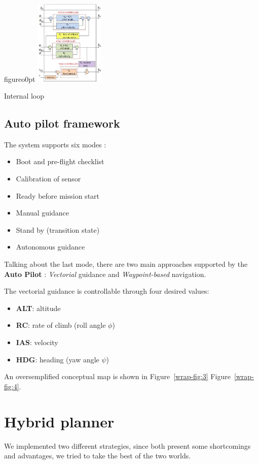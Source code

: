 \documentclass[oneside,onecolumn]{article}
\begin{document}
\begin{wrapfloat}{figure}{o}{0pt}
  \includegraphics[width=0.25\textwidth]{intLoop}
  \caption{Internal loop}\label{wrap-fig:4}
\end{wrapfloat} 


\subsection{Auto pilot framework}

The system supports six modes :
\begin{itemize}
\item Boot and pre-flight checklist
\item Calibration of sensor 
\item Ready before mission start
\item Manual guidance
\item Stand by (transition state)
\item Autonomous guidance
\end{itemize}

Talking about the last mode, there are two main approaches supported by the
\textbf{Auto Pilot} : \textit{Vectorial} guidance and \textit{Waypoint-based}
navigation.



The vectorial guidance is controllable through four desired values:
\begin{itemize}
\item \textbf{ALT}: altitude
\item \textbf{RC}: rate of climb (roll angle $\phi$)
\item \textbf{IAS}: velocity
\item \textbf{HDG}: heading (yaw angle $\psi$)
\end{itemize}
An oversemplified conceptual map is shown in Figure~\ref{wrap-fig:3} Figure~\ref{wrap-fig:4}.
\newpage
\section{Hybrid planner}
We implemented two different strategies, since both present some shortcomings
and advantages, we tried to take the best of the two worlds.
\end{document}
